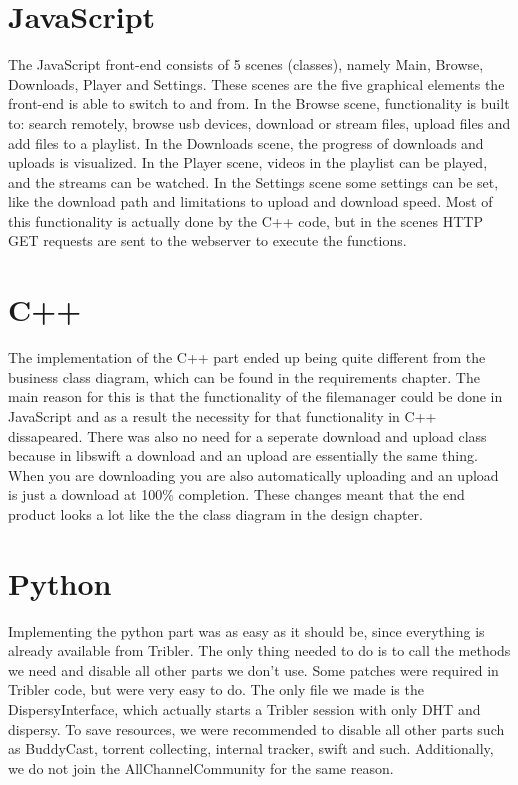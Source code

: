 \section{JavaScript}
The JavaScript front-end consists of 5 scenes (classes), namely Main, Browse, Downloads, Player and Settings.
These scenes are the five graphical elements the front-end is able to switch to and from.
In the Browse scene, functionality is built to: search remotely, browse usb devices, download or stream files,
upload files and add files to a playlist. In the Downloads scene, the progress of downloads and uploads is visualized.
In the Player scene, videos in the playlist can be played, and the streams can be watched.
In the Settings scene some settings can be set, like the download path and limitations to upload and download speed.
Most of this functionality is actually done by the C++ code, but in the scenes HTTP GET requests are sent to the webserver to execute the functions.

\section{C++}

The implementation of the C++ part ended up being quite different from the business class diagram, which can be found in the requirements chapter. The main reason for this is that the functionality of the filemanager could be done in JavaScript and as a result the necessity for that functionality in C++ dissapeared. There was also no need for a seperate download and upload class because in libswift a download and an upload are essentially the same thing. When you are downloading you are also automatically uploading and an upload is just a download at 100\% completion. These changes meant that the end product looks a lot like the the class diagram in the design chapter.

\section{Python}
Implementing the python part was as easy as it should be, since everything is already available from Tribler. The only thing needed to do is to call the methods we need and disable all other parts we don't use. Some patches were required in Tribler code, but were very easy to do.
The only file we made is the DispersyInterface, which actually starts a Tribler session with only DHT and dispersy. To save resources, we were recommended to disable all other parts such as BuddyCast, torrent collecting, internal tracker, swift and such. Additionally, we do not join the AllChannelCommunity for the same reason.

